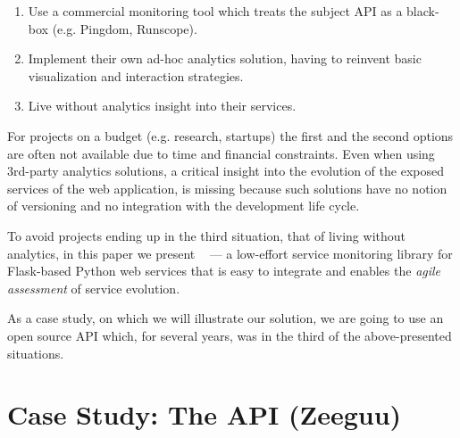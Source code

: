 \documentclass[conference]{IEEEtran}
\begin{document}
  \begin{enumerate}

    \item Use a commercial monitoring tool which treats the subject API as a black-box (e.g. Pingdom, Runscope). 

    \item Implement their own ad-hoc analytics solution, having to reinvent basic visualization and interaction strategies. 

    \item Live without analytics insight into their services.

  \end{enumerate}


For projects on a budget (e.g. research, startups) the first and the second options are often not available due to time and financial constraints. Even when using 3rd-party analytics solutions, a critical insight into the evolution of the exposed services of the web application, is missing because such solutions have no notion of versioning and no integration with the development life cycle.~\cite{papazoglou2011managing}

To avoid projects ending up in the third situation, that of living without analytics, in this paper we present \tool~ --- a low-effort service monitoring library for Flask-based Python web services that is easy to integrate and enables the {\em agile assessment} of service evolution. \cite{Nier12b}

As a case study, on which we will illustrate our solution, we are going to use an open source API which, for several years, was in the third of the above-presented situations.





\section{Case Study: The API (Zeeguu)}
\label{sec:case}
\end{document}
